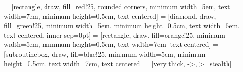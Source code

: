 \makeatletter
{}

 = [rectangle, draw, fill=red!25, rounded corners, minimum width=5em, text width=7em, minimum height=0.5cm, text centered]
 = [diamond, draw, fill=green!25, minimum width=5em, minimum height=0.5cm, text width=5em, text centered, inner sep=0pt]
 = [rectangle, draw, fill=orange!25, minimum width=5em, minimum height=0.5cm, text width=7em, text centered]
 = [subroutinebox, draw, fill=blue!25, minimum width=5em, minimum height=0.5cm, text width=7em, text centered]
 = [very thick, ->, >=stealth]